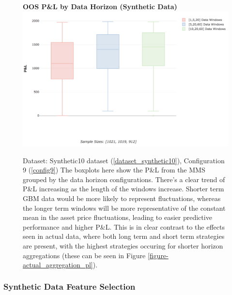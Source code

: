 \documentclass[a4paper,11pt,oneside]{article}
\theoremstyle{plain}
\theoremstyle{definition}
\begin{document}
	\begin{figure}[H]
		\centering 
		\textbf{OOS P\&L by Data Horizon (Synthetic Data)}
		\includegraphics[scale=0.3]{images/results/data/test_aggregation_pl.png}
		\caption[OOS P\&L by Data Aggregation (Synthetic Data)]{
			Dataset: Synthetic10 dataset (\ref{dataset_synthetic10}), Configuration 9 (\ref{config9})
			\newline  The boxplots here show the P\&L from the MMS grouped by the data horizon configurations. There's a clear trend of P\&L increasing as the length of the windows increase. Shorter term GBM data would be more likely to represent fluctuations, whereas the longer term windows will be more representative of the constant mean in the asset price fluctuations, leading to easier predictive performance and higher P\&L. This is in clear contrast to the effects seen in actual data, where both long term and short term strategies are present, with the highest strategies occuring for shorter horizon aggregations (these can be seen in Figure \ref{figure-actual_aggregation_pl}).}
		\label{figure-test_aggregation_pl}
	\end{figure}
	
	\subsubsection{Synthetic Data Feature Selection}\label{results_synthdata_feature_selection}
	
\end{document}
